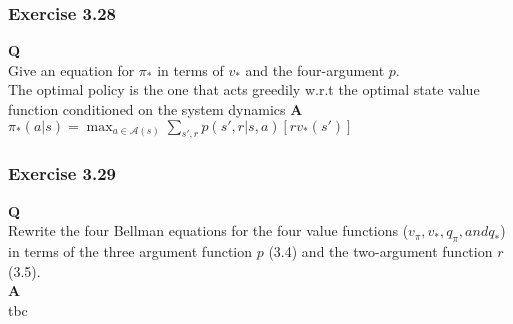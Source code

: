 \subsubsection{Exercise 3.28}
\textbf{Q}\\
Give an equation for $\pi_*$ in terms of $v_*$ and the four-argument $p$.\\

The optimal policy is the one that acts greedily w.r.t the optimal state value function conditioned on the system dynamics
\textbf{A}\\
$
\pi_*(a|s) = \max_{a \in \mathcal{A}(s)} \sum_{s', r} p(s', r | s, a)[r  v_*(s')]
$

\subsubsection{Exercise 3.29}
\textbf{Q}\\
Rewrite the four Bellman equations for the four value functions ($v_\pi, v_*, q_\pi,and q_*$) in terms of the three argument function $p$ (3.4) and the two-argument function $r$ (3.5).\\

\textbf{A}\\
tbc







